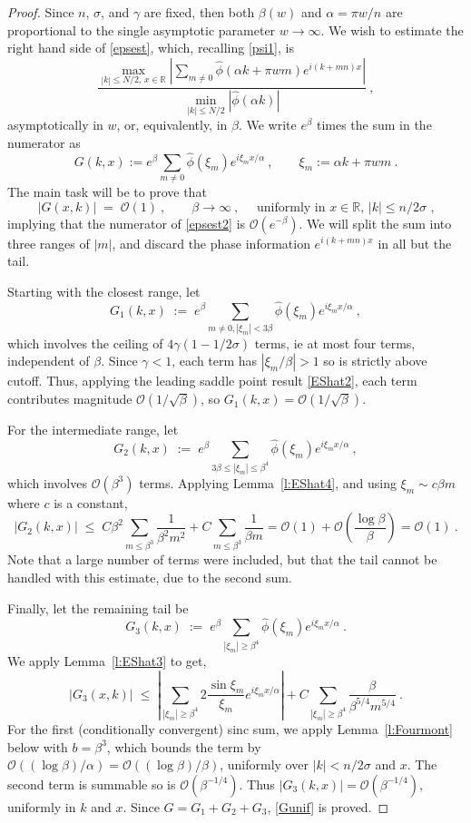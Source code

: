 \documentclass[10pt]{article}
\newcommand{\be}{\begin{equation}}
\newcommand{\ee}{\end{equation}}
\newcommand{\RR}{\mathbb{R}}
\newcommand{\bigO}{{\mathcal O}}
\newcommand{\freq}{\beta}          %
\newcommand{\rat}{\sigma}          %
\newcommand{\al}{\alpha}           %
\begin{document}
\begin{proof}
  Since $n$, $\rat$, and $\gamma$ are fixed, then both $\freq(w)$
  and $\al=\pi w/n$ are proportional to the single asymptotic
  parameter $w \to\infty$.
  We wish to estimate the right hand side of
  \eqref{epsest}, which, recalling \eqref{psi1}, is
  \be
\frac{
  \max_{|k|\le N/2, \,x\in\RR} \left|
    \sum_{m\neq 0} \hat\phi(\al k+\pi w m) e^{i(k+mn)x}
  \right|
}{\min_{|k|\le N/2} |\hat\phi(\al k)|}
~,
\label{epsest2}
\ee
  asymptotically in $w$, or, equivalently, in $\freq$.
  We write $e^\freq$ times the sum in the numerator as
  \be
  G(k,x) := e^{\freq} \sum_{m\neq 0} \hat\phi(\xi_m) e^{i\xi_m x/\al}
  ~, \qquad \xi_m := \al k + \pi w m
  ~.
  \label{G}
  \ee
  The main task will be to prove that
  \be
  |G(x,k) | \; =\; \bigO(1)
  ~,\qquad \freq\to\infty~, \quad
  \mbox{ uniformly in $x\in\RR$, $|k|\le n/2\rat$~,}
  \label{Gunif}
  \ee
  implying that the numerator of \eqref{epsest2} is $\bigO(e^{-\freq})$.
  We will split the sum into three ranges of $|m|$, and discard the
  phase information $e^{i(k+mn)x}$ in all but the tail.

  Starting with the closest range, let
  $$
  G_1(k,x) \;:=\;
  e^{\freq} \sum_{m\neq 0, |\xi_m|<3\freq} \hat\phi(\xi_m) e^{i\xi_m x/\al}~,
  $$
  which involves the ceiling of $4\gamma(1-1/2\rat)$ terms,
  ie at most four terms, independent of $\freq$.
  Since $\gamma<1$, each term has $|\xi_m/\beta|>1$ so is strictly
  above cutoff.
  Thus, applying the leading saddle point result \eqref{EShat2}, each term
  contributes magnitude $\bigO(1/\sqrt{\freq})$, so
  $G_1(k,x) = \bigO(1/\sqrt{\freq})$.

  For the intermediate range, let
  $$
  G_2(k,x) \; :=\;
  e^{\freq} \sum_{3\freq\le|\xi_m|\le\freq^4} \hat\phi(\xi_m) e^{i\xi_m x/\al}~,
  $$
  which involves $\bigO(\freq^3)$ terms.
  Applying Lemma~\ref{l:EShat4}, and using $\xi_m \sim c \freq m$
  where $c$ is a constant,
  $$
  |G_2(k,x)| \;\le\; C \freq^2 \sum_{m\le \freq^3} \frac{1}{\freq^2 m^2}
  + C \sum_{m\le \freq^3} \frac{1}{\freq m}
  = \bigO(1) + \bigO\left(\frac{\log \freq}{\freq}\right) = \bigO(1)~.
  $$
  Note that a large number of terms were included, but that the tail
  cannot be handled with this estimate, due to the second sum.
  
  Finally, let the remaining tail be
  $$
  G_3(k,x)  \;:=\;
  e^{\freq} \sum_{|\xi_m|\ge\freq^4} \hat\phi(\xi_m) e^{i\xi_m x/\al}~.
  $$
  We apply Lemma~\ref{l:EShat3} to get,
  $$
  |G_3(x,k)| \; \le \; \left|\sum_{|\xi_m|\ge\freq^4} 2\frac{\sin \xi_m}{\xi_m}
   e^{i\xi_m x/\al} \right|
   + C \sum_{|\xi_m|\ge\freq^4} \frac{\freq}{\freq^{5/4}m^{5/4}}
   ~.
   $$
   For the first (conditionally convergent) sinc sum, we apply
   Lemma~\ref{l:Fourmont} below with $b = \freq^3$,
   which bounds the term
   by $\bigO((\log \freq) / \al) = \bigO((\log \freq) / \freq)$,
   uniformly over $|k|<n/2\rat$ and $x$.
   The second term is summable so is $\bigO(\freq^{-1/4})$.
   Thus $|G_3(k,x)| = \bigO(\freq^{-1/4})$, uniformly in $k$ and $x$.
   Since $G = G_1 + G_2+G_3$, \eqref{Gunif} is proved.
   

\end{proof}
\end{document}
